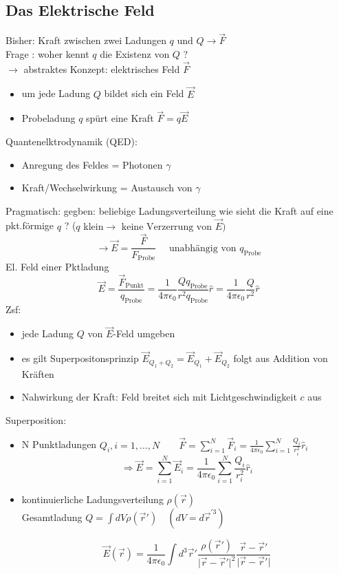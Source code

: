 \documentclass[titlepage,12pt,a4paper,ngerman]{report}
\newcommand{\tx}[1]{\textrm{#1}}
\begin{document}

\subsection{Das Elektrische Feld}
Bisher: Kraft zwischen zwei Ladungen $ q\textrm{ und } Q \rightarrow \vec{F}$\\
Frage : woher kennt $q$ die Existenz von $Q$ ?\\
$\rightarrow$ abstraktes Konzept: elektrisches Feld $\vec{F}$
\begin{itemize}
\item um jede Ladung $Q$ bildet sich ein Feld $\vec{E}$
\item Probeladung $q$ spürt eine Kraft $ \vec{F} = q \vec{E}$
\end{itemize}
Quantenelktrodynamik (QED): 
\begin{itemize}
\item Anregung des Feldes = Photonen $\gamma $ 
\item Kraft/Wechselwirkung = Austausch von $\gamma$
\end{itemize} 
Pragmatisch: gegben: beliebige Ladungsverteilung wie sieht die Kraft auf eine pkt.förmige $q$ ? ($q \textrm{ klein} \rightarrow \textrm{ keine Verzerrung von } \vec{E})$
$$\rightarrow \vec{E} = \frac{\vec{F}}{F_{\tx{Probe}}} \quad \textrm{ unabhängig von } q_{\tx{Probe}}$$
El. Feld einer Pktladung 
$$ \vec{E} = \frac{\vec{F}_{\tx{Punkt}}}{q_{\tx{Probe}}} = \frac{1}{4 \pi \epsilon_{0}} \frac{Q q_{\tx{Probe}}}{r^2 q_{\tx{Probe}}} \hat{r} = \frac{1}{4 \pi \epsilon_{0}} \frac{Q}{r^2} \hat{r}$$
Zsf: 
\begin{itemize}
\item jede Ladung $Q$ von $\vec{E}$-Feld umgeben
\item es gilt Superpositonsprinzip $\vec{E}_{Q_1 + Q_2} = \vec{E}_{Q_1} + \vec{E}_{Q_2}$ folgt aus Addition von Kräften
\item Nahwirkung der Kraft: Feld breitet sich mit Lichtgeschwindigkeit $c$ aus
\end{itemize}

Superposition:
\begin{itemize}
\item N Punktladungen $Q_i, i = 1, \dots , N
\qquad \vec{F} = \sum _{i=1}^{N} \vec{F}_i = \frac{1}{4 \pi \epsilon_{0}} \sum _{i=1}^{N} \frac{Q_i}{r^2_i} \hat{r}_i$
$$ \Rightarrow \vec{E} = \sum _{i=1}^{N} \vec{E}_i = \frac{1}{4 \pi \epsilon_{0}}  \sum _{i=1}^{N} \frac{Q_i}{r^2_i} \hat{r}_i$$
\item kontinuierliche Ladungsverteilung $\rho(\vec{r})$\\
Gesamtladung $Q = \int dV \rho(\vec{r}') \quad (dV = d \vec{r}^{'3})$

$$\vec{E} (\vec{r}) = \frac{1}{4 \pi \epsilon_0} \int d^3 \vec{r}' \frac{\rho (\vec{r}')}{\vert \vec{r}-\vec{r}' \vert ^2} \frac{\vec{r}-\vec{r}'}{\vert \vec{r}-\vec{r}' \vert}$$

\end{itemize}
  
\end{document}
